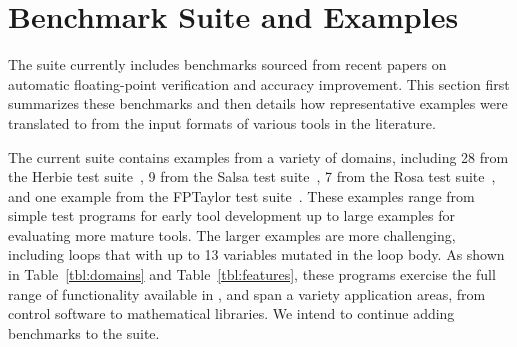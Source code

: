 \documentclass[main.tex]{subfiles}
\begin{document}
\section{Benchmark Suite and Examples}
\label{sec:case-studies}

The \name suite currently includes \nbenches benchmarks
  sourced from recent papers on automatic floating-point
  verification and accuracy improvement.
This section first summarizes these benchmarks
  and then details how representative examples
  were translated to \name from the input formats
  of various tools in the literature.



The current \name suite contains
  examples from a variety of domains, including
  28 from the Herbie test suite~\cite{pavel15},
  9 from the Salsa test suite~\cite{fmics15},
  7 from the Rosa test suite~\cite{DarulovaK14},
  and one example from the FPTaylor test suite~\cite{fptaylor-fm15}.
These examples range from simple test programs for
  early tool development up to
  large examples for evaluating more mature tools.
The larger examples are more challenging,
  including loops that with up to 13 variables mutated in the loop body.
As shown in Table~\ref{tbl:domains} and Table~\ref{tbl:features},
  these programs exercise the full range of functionality
  available in \name,
  and span a variety application areas,
  from control software to mathematical libraries.
We intend to continue adding benchmarks to the \name suite.
\end{document}
